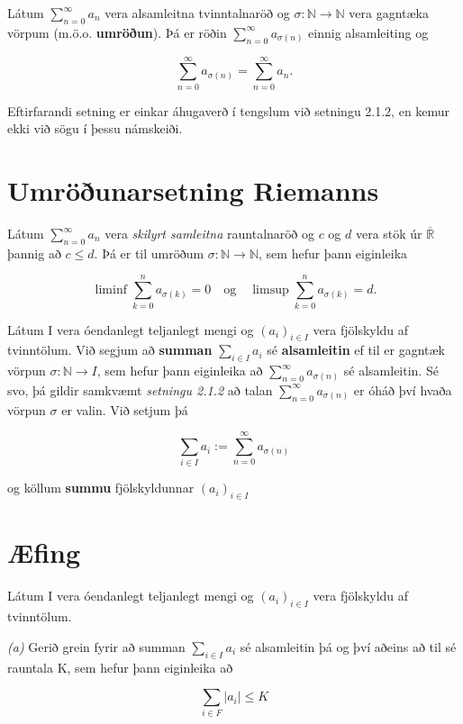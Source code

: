 \documentclass[]{book}
\begin{document}
Látum \(\sum_{n=0}^\infty a_n\) vera alsamleitna tvinntalnaröð og \(\sigma: \mathbb N \rightarrow \mathbb N\) vera gagntæka vörpum (m.ö.o. \textbf{umröðun}). Þá er röðin \(\sum_{n=0}^\infty a_{\sigma(n)}\) einnig alsamleiting og

\[
\sum_{n=0}^\infty a_{\sigma(n)} = \sum_{n=0}^\infty a_n.
\]

Eftirfarandi setning er einkar áhugaverð í tengslum við setningu 2.1.2, en kemur ekki við sögu í þessu námskeiði.

\hypertarget{umrounarsetning-riemanns}{%
\section{Umröðunarsetning Riemanns}\label{umrounarsetning-riemanns}}

Látum \(\sum_{n=0}^\infty a_n\) vera \emph{skilyrt samleitna} rauntalnaröð og \(c\) og \(d\) vera stök úr \(\overline{\mathbb R}\) þannig að \(c\leq d\). Þá er til umröðum \(\sigma: \mathbb N \rightarrow \mathbb N\), sem hefur þann eiginleika

\[
\liminf \sum_{k=0}^n a_{\sigma(k)} = 0 \quad \text{og} \quad \limsup \sum_{k=0}^n a_{\sigma(k)} = d.
\]

Látum I vera óendanlegt teljanlegt mengi og \((a_i)_{i\in I}\) vera fjölskyldu af tvinntölum. Við segjum að \textbf{summan} \(\sum_{i\in I}a_i\) sé \textbf{alsamleitin} ef til er gagntæk vörpun \(\sigma: \mathbb N \rightarrow I\), sem hefur þann eiginleika að \(\sum_{n=0}^\infty a_{\sigma(n)}\) sé alsamleitin. Sé svo, þá gildir samkvæmt \emph{setningu 2.1.2} að talan \(\sum_{n=0}^\infty a_{\sigma(n)}\) er óháð því hvaða vörpun \(\sigma\) er valin. Við setjum þá

\[
\sum_{i\in I}a_i := \sum_{n=0}^\infty a_{\sigma(n)}
\]

og köllum \textbf{summu} fjölskyldunnar \((a_i)_{i\in I}\)

\hypertarget{fing}{%
\section{Æfing}\label{fing}}

Látum I vera óendanlegt teljanlegt mengi og \((a_i)_{i\in I}\) vera fjölskyldu af tvinntölum.

\emph{(a)} Gerið grein fyrir að summan \(\sum_{i\in I}a_i\) sé alsamleitin þá og því aðeins að til sé rauntala K, sem hefur þann eiginleika að

\[
\sum_{i\in F} |a_i| \leq K
\]
\end{document}
